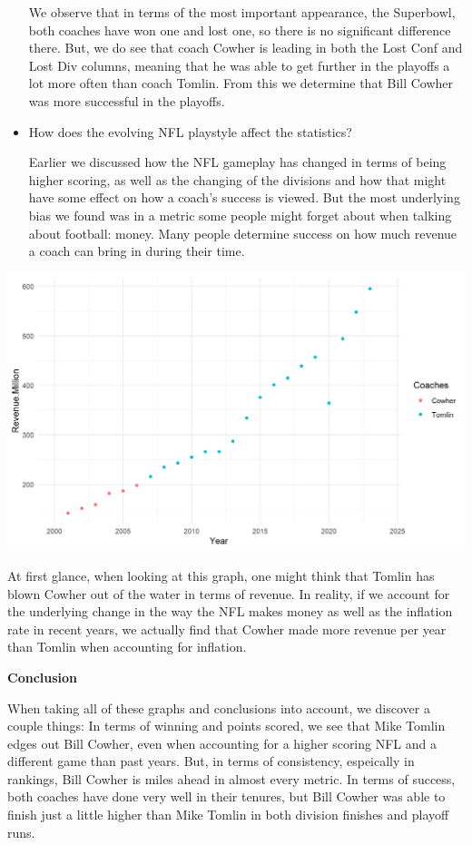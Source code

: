 \documentclass[
  letterpaper,
  DIV=11,
  numbers=noendperiod]{scrartcl}
\begin{document}
\begin{itemize}
  We observe that in terms of the most important appearance, the
  Superbowl, both coaches have won one and lost one, so there is no
  significant difference there. But, we do see that coach Cowher is
  leading in both the Lost Conf and Lost Div columns, meaning that he
  was able to get further in the playoffs a lot more often than coach
  Tomlin. From this we determine that Bill Cowher was more successful in
  the playoffs.
\item
  How does the evolving NFL playstyle affect the statistics?

  Earlier we discussed how the NFL gameplay has changed in terms of
  being higher scoring, as well as the changing of the divisions and how
  that might have some effect on how a coach's success is viewed. But
  the most underlying bias we found was in a metric some people might
  forget about when talking about football: money. Many people determine
  success on how much revenue a coach can bring in during their time.
\end{itemize}

\includegraphics{images/clipboard-244220973.png}

At first glance, when looking at this graph, one might think that Tomlin
has blown Cowher out of the water in terms of revenue. In reality, if we
account for the underlying change in the way the NFL makes money as well
as the inflation rate in recent years, we actually find that Cowher made
more revenue per year than Tomlin when accounting for inflation.

\textbf{Conclusion}

When taking all of these graphs and conclusions into account, we
discover a couple things: In terms of winning and points scored, we see
that Mike Tomlin edges out Bill Cowher, even when accounting for a
higher scoring NFL and a different game than past years. But, in terms
of consistency, espeically in rankings, Bill Cowher is miles ahead in
almost every metric. In terms of success, both coaches have done very
well in their tenures, but Bill Cowher was able to finish just a little
higher than Mike Tomlin in both division finishes and playoff runs.
\end{document}
